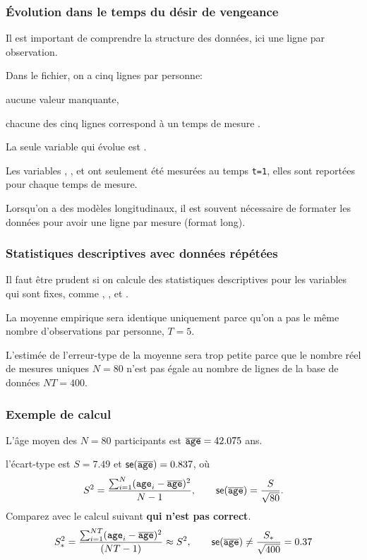 \documentclass{beamer}
\begin{document}
\begin{frame}
\frametitle{Évolution dans le temps du désir de vengeance}
\bi
\item Il est important de comprendre la \alert{structure} des données, ici une ligne par observation. 
\item Dans le fichier, on a cinq lignes par personne: 
\bi
\item  aucune valeur manquante, 
\item chacune des cinq lignes correspond à un temps de mesure . 
\ei
\item La seule variable qui évolue est .
\bi
\item Les variables , ,  et  ont seulement été mesurées au temps \texttt{t=1}, elles sont reportées pour chaque temps de mesure. 
\ei
\item Lorsqu'on a des modèles longitudinaux, il est souvent nécessaire de formater les données pour avoir une ligne par mesure (format long).
\ei
\end{frame}



\begin{frame}[fragile]
\frametitle{Statistiques descriptives avec données répétées}
 Il faut être prudent si on calcule des statistiques descriptives pour les variables qui sont fixes, comme , ,  et . 
\bi 
\item La moyenne empirique sera identique uniquement parce qu'on a pas le même nombre d'observations par personne, $T=5$.
\item L'estimée de l'erreur-type de la moyenne sera trop petite parce que le nombre réel de mesures uniques $N=80$ n'est pas égale au nombre de lignes de la base de données $NT=400$.
\ei
\end{frame}
\begin{frame}
\frametitle{Exemple de calcul}
L'âge moyen des $N=80$ participants est $\overline{\texttt{age}}= 42.075$ ans.
\bi
\item l'écart-type est $S=7.49$ et $\mathsf{se}(\overline{\texttt{age}})= 0.837$, où
\[S^2=\frac{\sum_{i=1}^N (\texttt{age}_i-\overline{\texttt{age}})^2}{N-1}, \qquad \mathsf{se}(\overline{\texttt{age}})=\frac{S}{\sqrt{80}}.\]
\ei
Comparez avec le calcul suivant \textbf{qui n'est pas correct}.
\[S^2_{*} = \frac{\sum_{i=1}^{NT} (\texttt{age}_i-\overline{\texttt{age}})^2}{(NT-1)} \approx S^2, \qquad \mathsf{se}(\overline{\texttt{age}}) \neq\frac{S_*}{\sqrt{400}} = 0.37 \]
\end{frame}
\end{document}
